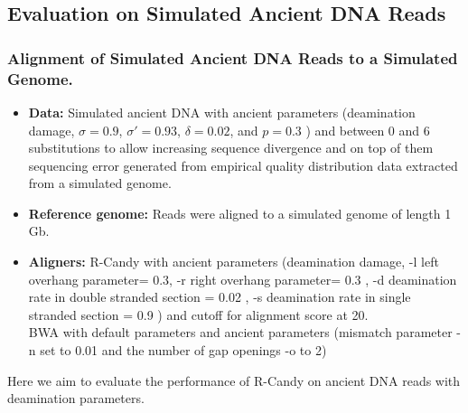 \documentclass[11pt,a4paper]{report}
\begin{document}
\subsection{Evaluation on Simulated Ancient DNA Reads}

\subsubsection{Alignment of Simulated Ancient DNA Reads to a Simulated Genome.}
\label{ Alignment of Simulated Ancient DNA Reads to a Simulated Genome.}

\begin{itemize}
 
   
    \item \textbf{Data:} Simulated ancient DNA 
     with ancient parameters (deamination damage, $ \sigma = 0.9$, 
    $ \sigma' = 0.93 $, $\delta = 0.02 $,  and $p = 0.3 $ \cite{mapdamage2})
    and between 0 and 6 substitutions to allow increasing sequence divergence
    and on top of them sequencing error generated from empirical quality distribution data
    extracted from a simulated genome.
  
 

  \item \textbf{Reference genome:}  Reads were aligned to a simulated genome of 
length 1 Gb.


  \item \textbf{Aligners:} R-Candy with ancient parameters 
  (deamination damage, -l left overhang parameter= 0.3, -r right overhang parameter= 0.3 , 
-d deamination rate in double stranded section = 0.02 , 
-s deamination rate in single stranded section = 0.9 )
  and cutoff for alignment score at 20. \\
  BWA with default parameters and ancient parameters \cite{green2010draft}
   (mismatch parameter -n set to 0.01 and the number of gap openings -o
   to 2)

  \end{itemize}


Here we aim to evaluate the performance of R-Candy on ancient DNA reads
with deamination parameters.
\end{document}
